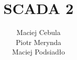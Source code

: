 \documentclass[12pt]{report}
\title{\textbf{SCADA 2}}
\author{Maciej Cebula \\Piotr Merynda \\Maciej Podsiadło}
\date{}
\begin{document}
	

	
	\setcounter{tocdepth}{2}
	
	\maketitle
	\tableofcontents
	\clearpage
		
		\renewcommand{\tablename}{Tabela}
		\renewcommand{\figurename}{Rys.}
		
	
	
	
	
	
	
	
\end{document}
